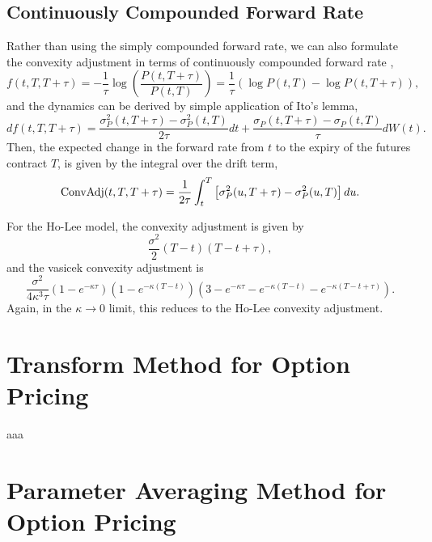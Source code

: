 \documentclass[12pt]{article}
\begin{document}
    \subsection{Continuously Compounded Forward Rate}

      Rather than using the simply compounded forward rate, we can also formulate the convexity adjustment in terms of continuously
      compounded forward rate \cite{HW},
      \begin{equation}
        f(t,T,T+\tau) = -\frac{1}{\tau}\log\left(\frac{P(t,T+\tau)}{P(t,T)}\right)
                      = \frac{1}{\tau}\left(\log P(t,T)-\log P(t,T+\tau)\right),
      \end{equation}
      and the dynamics can be derived by simple application of Ito's lemma,
      \begin{equation}
        df(t,T,T+\tau) = \frac{\sigma_P^2(t,T+\tau)-\sigma_P^2(t,T)}{2\tau}dt
                       + \frac{\sigma_P(t,T+\tau)-\sigma_P(t,T)}{\tau}dW(t).
      \end{equation}
      Then, the expected change in the forward rate from $t$ to the expiry of the futures contract $T$, is
      given by the integral over the drift term,
      \begin{equation}
        {\rm ConvAdj}(t,T,T+\tau)=\frac{1}{2\tau}\int_t^T\left[\sigma_P^2(u,T+\tau)-\sigma_P^2(u,T)\right]du.
      \end{equation}

      For the Ho-Lee model, the convexity adjustment is given by
      \begin{equation}
        \frac{\sigma^2}{2}(T-t)(T-t+\tau),
      \end{equation}
      and the vasicek convexity adjustment is
      \begin{equation}
        \frac{\sigma^2}{4\kappa^3\tau}\left(1-e^{-\kappa\tau}\right)\left(1-e^{-\kappa(T-t)}\right)
                                      \left(3-e^{-\kappa\tau}-e^{-\kappa(T-t)}-e^{-\kappa(T-t+\tau)}\right).
      \end{equation}
      Again, in the $\kappa\rightarrow 0$ limit, this reduces to the Ho-Lee convexity adjustment.

  \section{Transform Method for Option Pricing}
  \label{fourier}

  aaa

  \section{Parameter Averaging Method for Option Pricing}
  \label{PA}
\end{document}
